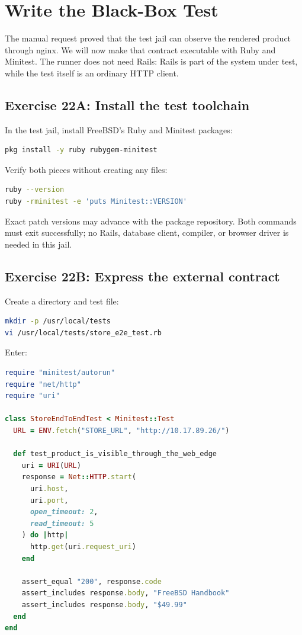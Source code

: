 \chapter{Write the Black-Box Test}

The manual request proved that the test jail can observe the rendered product
through nginx. We will now make that contract executable with Ruby and
Minitest. The runner does not need Rails: Rails is part of the system under
test, while the test itself is an ordinary HTTP client.

\section{Exercise 22A: Install the test toolchain}

In the test jail, install FreeBSD's Ruby and Minitest packages:

\begin{lstlisting}[language=sh]
pkg install -y ruby rubygem-minitest
\end{lstlisting}

Verify both pieces without creating any files:

\begin{lstlisting}[language=sh]
ruby --version
ruby -rminitest -e 'puts Minitest::VERSION'
\end{lstlisting}

Exact patch versions may advance with the package repository. Both commands
must exit successfully; no Rails, database client, compiler, or browser driver
is needed in this jail.

\section{Exercise 22B: Express the external contract}

Create a directory and test file:

\begin{lstlisting}[language=sh]
mkdir -p /usr/local/tests
vi /usr/local/tests/store_e2e_test.rb
\end{lstlisting}

Enter:

\begin{lstlisting}[language=Ruby]
require "minitest/autorun"
require "net/http"
require "uri"

class StoreEndToEndTest < Minitest::Test
  URL = ENV.fetch("STORE_URL", "http://10.17.89.26/")

  def test_product_is_visible_through_the_web_edge
    uri = URI(URL)
    response = Net::HTTP.start(
      uri.host,
      uri.port,
      open_timeout: 2,
      read_timeout: 5
    ) do |http|
      http.get(uri.request_uri)
    end

    assert_equal "200", response.code
    assert_includes response.body, "FreeBSD Handbook"
    assert_includes response.body, "$49.99"
  end
end
\end{lstlisting}

